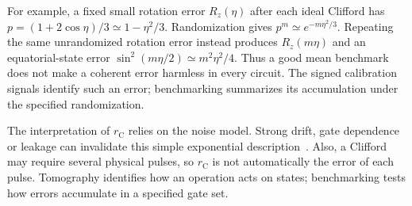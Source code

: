 For example, a fixed small rotation error $R_z(\eta)$ after
each ideal Clifford has
$p=(1+2\cos\eta)/3\simeq1-\eta^2/3$.
Randomization gives
$p^m\simeq e^{-m\eta^2/3}$.
Repeating the same unrandomized rotation error instead produces
$R_z(m\eta)$ and an equatorial-state error
$\sin^2(m\eta/2)\simeq m^2\eta^2/4$.
Thus a good mean benchmark does not make a coherent error harmless
in every circuit. The signed calibration signals identify such
an error; benchmarking summarizes its accumulation under the
specified randomization.

The interpretation of $r_{\mathrm C}$ relies on the noise model. Strong drift,
gate dependence or leakage can invalidate this simple exponential
description~\cite{Magesan2012}. Also, a Clifford may require several
physical pulses, so $r_{\mathrm C}$ is not automatically the error
of each pulse. Tomography identifies how an operation acts on states;
benchmarking tests how errors accumulate in a specified gate set.
